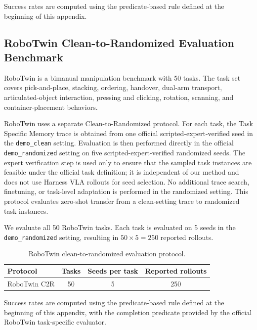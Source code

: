 \documentclass{article}
\begin{document}
Success rates are computed using the predicate-based rule defined at the beginning of this appendix.

\subsection{RoboTwin Clean-to-Randomized Evaluation Benchmark}
\label{app:benchmark:robotwin}

RoboTwin is a bimanual manipulation benchmark with 50 tasks. The task set covers pick-and-place, stacking, ordering, handover, dual-arm transport, articulated-object interaction, pressing and clicking, rotation, scanning, and container-placement behaviors.

RoboTwin uses a separate Clean-to-Randomized protocol. For each task, the Task Specific Memory trace is obtained from one official scripted-expert-verified seed in the \texttt{demo\_clean} setting. Evaluation is then performed directly in the official \texttt{demo\_randomized} setting on five scripted-expert-verified randomized seeds. The expert verification step is used only to ensure that the sampled task instances are feasible under the official task definition; it is independent of our method and does not use Harness VLA rollouts for seed selection. No additional trace search, finetuning, or task-level adaptation is performed in the randomized setting. This protocol evaluates zero-shot transfer from a clean-setting trace to randomized task instances.

We evaluate all 50 RoboTwin tasks. Each task is evaluated on 5 seeds in the \texttt{demo\_randomized} setting, resulting in $50 \times 5 = 250$ reported rollouts.

\begin{table}[h]
    \centering
    \caption{RoboTwin clean-to-randomized evaluation protocol.}
    \label{tab:app_robotwin_protocol}
    \begin{tabular}{lccc}
        \toprule
        Protocol & Tasks & Seeds per task & Reported rollouts \\
        \midrule
        RoboTwin C2R & 50 & 5 & 250 \\
        \bottomrule
    \end{tabular}
\end{table}


Success rates are computed using the predicate-based rule defined at the beginning of this appendix, with the completion predicate provided by the official RoboTwin task-specific evaluator.
\end{document}
